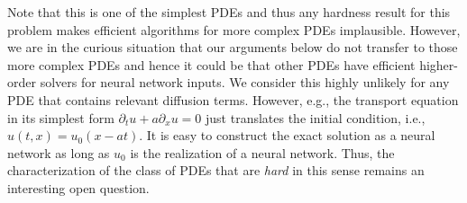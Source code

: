 \documentclass{amsart}[11pt]
\numberwithin{equation}{section}
\numberwithin{theorem}{section}
\begin{document}
\begin{remark} 
Note that this is one of the simplest PDEs and thus any hardness result for this problem makes efficient algorithms for more complex PDEs implausible. However, we are in the curious situation that our arguments below do not transfer to those more complex PDEs and hence it could be that other PDEs have efficient higher-order solvers for neural network inputs. We consider this highly unlikely for any PDE that contains relevant diffusion terms. However, e.g., the transport equation in its simplest form $\partial_t u +a \partial_x u=0$ just translates the initial condition, i.e., $u(t,x)=u_0(x-at)$. It is easy to construct the exact solution as a neural network as long as $u_0$ is the realization of a neural network. Thus, the characterization of the class of PDEs that are \emph{hard} in this sense remains an interesting open question.
\end{remark}
\end{document}
